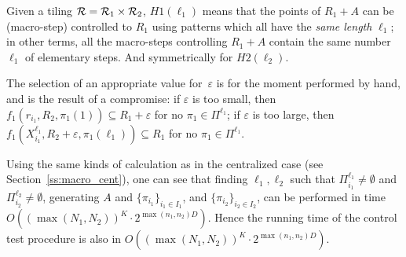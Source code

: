 \begin{remark}
  Given a tiling ${\cal R}={\cal R}_1\times{\cal R}_2$, $H1(\ell_1)$ means
  that the points of $R_1+A$ can be (macro-step) controlled to $R_1$
  using patterns which all have the \emph{same length} $\ell_1$; in other
  terms, all the macro-steps controlling $R_1+A$ contain the same
  number $\ell_1$ of elementary steps.  And symmetrically for $H2(\ell_2)$.
\end{remark}
\begin{remark}
  The selection of an appropriate value for~$\varepsilon$ is for the
  moment performed by hand, and is the result of a compromise: if
  $\varepsilon$ is too small, then $f_1(r_{i_1},R_2,\pi_1(1))\subseteq
  R_1+\varepsilon$ for no $\pi_1\in\Pi^{\ell_1}$; if $\varepsilon$ is
  too large, then
  $f_1(X_{i_1}^{\ell_1},R_2+\varepsilon,\pi_1(\ell_1))\subseteq R_1$
  for no $\pi_1\in\Pi^{\ell_1}$.
\end{remark}

%
Using the same kinds of calculation as in the centralized case (see
Section~\ref{ss:macro_cent}), one can see that
finding $\ell_1,\ell_2$ such that $\Pi_{i_1}^{\ell_1}\neq \emptyset$
and $\Pi_{i_2}^{\ell_2}\neq \emptyset$,
generating $A$ and $\{\pi_{i_1}\}_{i_1\in I_1}$,
and $\{\pi_{i_2}\}_{i_2\in I_2}$,
can be performed in time $O((\max(N_1,N_2))^K\cdot 2^{\max(n_1,n_2)D})$.
Hence the running time of the control test procedure is also in
$O((\max(N_1,N_2))^K\cdot 2^{\max(n_1,n_2)D})$.

